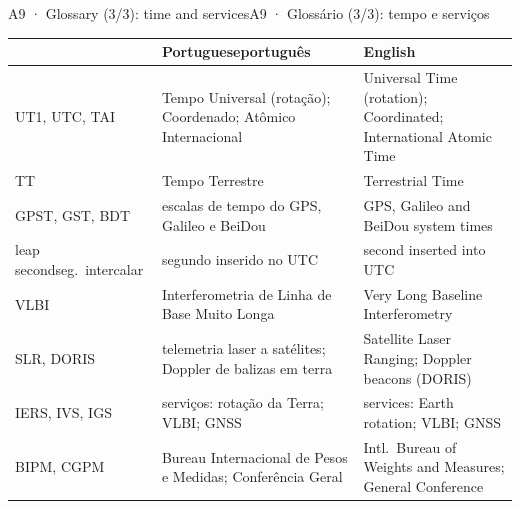 \documentclass[aspectratio=169,11pt]{beamer}
\newcommand{\tr}[2]{\ifEN#2\else#1\fi}
\begin{document}
\begin{frame}{\tr{A9 · Glossário (3/3): tempo e serviços}{A9 · Glossary (3/3): time and services}}
  \centering
  \scriptsize
  \renewcommand{\arraystretch}{1.3}
  \setlength{\tabcolsep}{4pt}
  \begin{tabular}{@{}>{\raggedright\arraybackslash}p{1.8cm}>{\raggedright\arraybackslash}p{5.4cm}>{\raggedright\arraybackslash}p{5.4cm}@{}}
    \toprule
    & \tr{português}{Portuguese} & English \\
    \midrule
    UT1, UTC, TAI & Tempo Universal (rotação); Coordenado; Atômico Internacional & Universal Time (rotation); Coordinated; International Atomic Time \\
    TT & Tempo Terrestre & Terrestrial Time \\
    GPST, GST, BDT & escalas de tempo do GPS, Galileo e BeiDou & GPS, Galileo and BeiDou system times \\
    \tr{seg.\ intercalar}{leap second} & segundo inserido no UTC & second inserted into UTC \\
    VLBI & Interferometria de Linha de Base Muito Longa & Very Long Baseline Interferometry \\
    SLR, DORIS & telemetria laser a satélites; Doppler de balizas em terra & Satellite Laser Ranging; Doppler beacons (DORIS) \\
    IERS, IVS, IGS & serviços: rotação da Terra; VLBI; GNSS & services: Earth rotation; VLBI; GNSS \\
    BIPM, CGPM & Bureau Internacional de Pesos e Medidas; Conferência Geral & Intl.\ Bureau of Weights and Measures; General Conference \\
    \bottomrule
  \end{tabular}
\end{frame}
\end{document}
